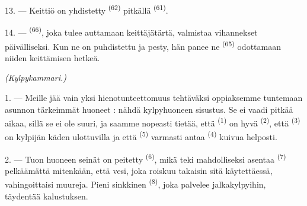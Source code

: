 13. --- Keittiö on yhdistetty  \textsuperscript{(62)}
pitkällä  \textsuperscript{(61)}.

14. ---  \textsuperscript{(66)}, joka tulee
auttamaan keittäjätärtä, valmistaa vihannekset päivälliseksi. Kun ne on
puhdistettu ja pesty, hän panee ne  \textsuperscript{(65)}
odottamaan niiden keittämisen hetkeä.

\VUsaut{4.0mm}
{\centering\fontsize{10.2pt}{10.2pt}\selectfont{} \textit{(Kylpykammari.)}\par}
\VUsaut{3.0mm}

1. --- Meille jää vain yksi hienotunteettomuus tehtäväksi oppiaksemme tuntemaan
asunnon tärkeimmät huoneet : nähdä kylpyhuoneen sisustus. Se ei vaadi pitkää
aikaa, sillä se ei ole suuri, ja saamme nopeasti tietää, että
 \textsuperscript{(1)} on hyvä 
\textsuperscript{(2)}, että  \textsuperscript{(3)} on
kylpijän käden ulottuvilla ja että 
\textsuperscript{(5)} varmasti antaa  \textsuperscript{(4)}
kuivua helposti.

2. --- Tuon huoneen seinät on peitetty 
\textsuperscript{(6)}, mikä teki mahdolliseksi asentaa 
\textsuperscript{(7)} pelkäämättä mitenkään, että vesi, joka roiskuu takaisin
sitä käytettäessä, vahingoittaisi muureja. Pieni sinkkinen 
\textsuperscript{(8)}, joka palvelee jalkakylpyihin, täydentää kalustuksen.
\VUsaut{6.0mm}
\VUfilet{22mm}
